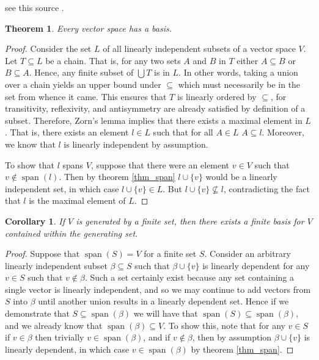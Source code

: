 \documentclass[oneside, 12pt]{book}
\DeclareMathOperator{\spn}{span}
\newtheorem{thm}{Theorem}[section]
\newtheorem{cor}{Corollary}[section]
\theoremstyle{definition}
\begin{document}
see this source \textcite{jechset}.
\begin{thm}
\label{thm_basis}
Every vector space has a basis.
\end{thm}
\begin{proof}
  Consider the set $L$ of all linearly independent subsets of a vector space $V$. Let $T \subseteq L$ be a chain. That is, for any two sets $A$ and $B$ in $T$ either $A \subseteq B$ or $B \subseteq A$. Hence, any finite subset of $\bigcup T$ is in $L$. In other words, taking a union over a chain yields an upper bound under $\subseteq$ which must necessarily be in the set from whence it came. This ensures that $T$ is linearly ordered by $\subseteq$, for transitivity, reflexivity, and antisymmetry are already satisfied by definition of a subset. Therefore, Zorn's lemma implies that there exists a maximal element in $L$. That is, there exists an element $l \in L$ such that for all $A \in L$ $A \subseteq l$. Moreover, we know that $l$ is linearly independent by assumption.

  To show that $l$ spans $V$, suppose that there were an element $v \in V$ such that $v\notin \spn(l)$. Then by theorem \ref{thm_span} $l \cup \{v\}$ would be a linearly independent set, in which case $l \cup \{v\} \in L $. But $l \cup \{v \} \nsubseteq l$, contradicting the fact that $l$ is the maximal element of $L$.
\end{proof}
\begin{cor}
  \label{cor_bascard}
If $V$ is generated by a finite set, then there exists a finite basis for $V$ contained within the generating set.
\end{cor}
\begin{proof}
  Suppose that $\spn(S)=V$ for a finite set $S$. Consider an arbitrary linearly independent subset $\beta \subseteq S$ such that $\beta \cup \{v\}$ is linearly dependent for any $v \in S$ such that $v \notin \beta$. Such a set certainly exist because any set containing a single vector is linearly independent, and so we may continue to add vectors from $S$ into $\beta$ until another union results in a linearly dependent set. Hence if we demonstrate that $S \subseteq \spn(\beta)$ we will have that $\spn(S)\subseteq \spn(\beta)$, and we already know that $\spn(\beta)\subseteq V$. To show this, note that for any $v \in S$ if $v \in \beta$ then trivially $v \in \spn(\beta)$, and if $v \notin \beta$, then by assumption $\beta \cup \{v\}$ is linearly dependent, in which case $v \in \spn(\beta)$ by theorem \ref{thm_span}.
\end{proof}
\end{document}
